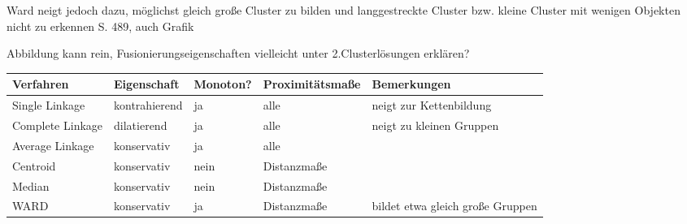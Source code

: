 Ward neigt jedoch dazu, möglichst gleich große Cluster zu bilden und langgestreckte Cluster bzw. kleine Cluster mit wenigen Objekten nicht zu erkennen \cite{Backhaus.2016} S. 489, auch Grafik

Abbildung kann rein, Fusionierungseigenschaften vielleicht unter 2.Clusterlösungen erklären?


\begin{tabular}{|l|l|l|l|p{3.7cm}|}
	\hline
	\rowcolor{babyblueeyes}Verfahren & Eigenschaft & Monoton? & Proximitätsmaße & Bemerkungen \\ \hline
	\rowcolor{beaublue}Single Linkage & kontrahierend & ja & alle & neigt zur Kettenbildung \\ \hline
	\rowcolor{beaublue}Complete Linkage & dilatierend & ja & alle & neigt zu kleinen Gruppen \\ \hline	
	\rowcolor{beaublue}Average Linkage & konservativ & ja & alle & \\ \hline
	\rowcolor{beaublue}Centroid & konservativ & nein & Distanzmaße & \\ \hline
	\rowcolor{beaublue}Median & konservativ & nein & Distanzmaße & \\ \hline
	\rowcolor{beaublue}WARD & konservativ & ja & Distanzmaße & bildet etwa gleich große Gruppen \\ \hline
\end{tabular}
